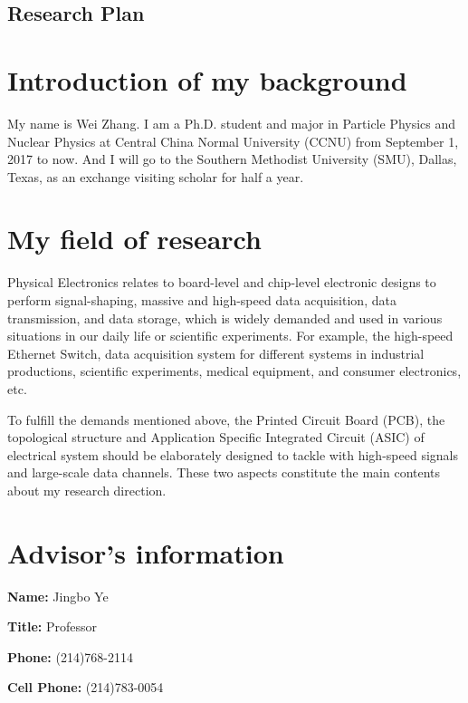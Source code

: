 \documentclass[11pt,a4paper]{article}
\begin{document}
\begin{spacing}{1.2}           %

\begin{center}
\section*{\huge Research Plan}
\end{center}

\section*{Introduction of my background}    %
My name is Wei Zhang. I am a Ph.D. student and major in Particle Physics and Nuclear Physics at Central China Normal University (CCNU) from September 1, 2017 to now. And I will go to the Southern Methodist University (SMU), Dallas, Texas, as an exchange visiting scholar for half a year.
\section*{My field of research}    %
Physical Electronics relates to board-level and chip-level electronic designs to perform signal-shaping, massive and high-speed data acquisition, data transmission, and data storage, which is widely demanded and used in various situations in our daily life or scientific experiments. For example, the high-speed Ethernet Switch, data acquisition system for different systems in industrial productions, scientific experiments, medical equipment, and consumer electronics, etc.

To fulfill the demands mentioned above, the Printed Circuit Board (PCB), the topological structure and Application Specific Integrated Circuit (ASIC) of electrical system should be elaborately designed to tackle with high-speed signals and large-scale data channels. These two aspects constitute the main contents about my research direction.

\section*{Advisor's information}     %
\begin{multicols}{2}
\textbf{Name:} Jingbo Ye   

\textbf{Title:} Professor 

\textbf{Phone:} (214)768-2114

\textbf{Cell Phone:} (214)783-0054


\end{multicols}
\end{spacing}
\end{document}
